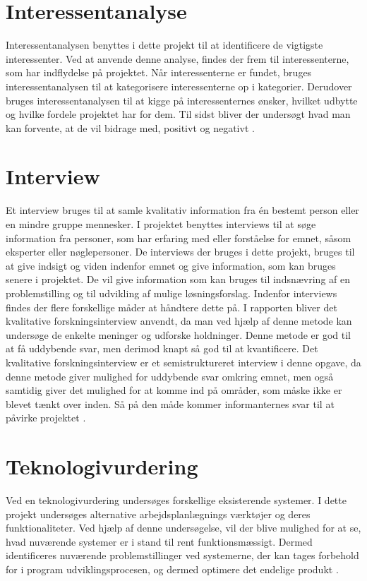 \section{Interessentanalyse}
Interessentanalysen benyttes i dette projekt til at identificere de vigtigste interessenter. Ved at anvende denne analyse, findes der frem til interessenterne, som har indflydelse på projektet. Når interessenterne er fundet, bruges interessentanalysen til at kategorisere interessenterne op i kategorier. Derudover bruges interessentanalysen til at kigge på interessenternes ønsker, hvilket udbytte og hvilke fordele projektet har for dem. Til sidst bliver der undersøgt hvad man kan forvente, at de vil bidrage med, positivt og negativt \citep{MetteLindegaardAttrup2008}.

\section{Interview}
Et interview bruges til at samle kvalitativ information fra én bestemt person eller en mindre gruppe mennesker. I projektet benyttes interviews til at søge information fra personer, som har erfaring med eller forståelse for emnet, såsom eksperter eller nøglepersoner. De interviews der bruges i dette projekt, bruges til at give indsigt og viden indenfor emnet og give information, som kan bruges senere i projektet. De vil give information som kan bruges til indsnævring af en problemstilling og til udvikling af mulige løsningsforslag.
Indenfor interviews findes der flere forskellige måder at håndtere dette på. I rapporten bliver det kvalitative forskningsinterview anvendt, da man ved hjælp af denne metode kan undersøge de enkelte meninger og udforske holdninger. Denne metode er god til at få uddybende svar, men derimod knapt så god til at kvantificere.
Det kvalitative forskningsinterview er et semistruktureret interview i denne opgave, da denne metode giver mulighed for uddybende svar omkring emnet, men også samtidig giver det mulighed for at komme ind på områder, som måske ikke er blevet tænkt over inden. Så på den måde kommer informanternes svar til at påvirke projektet \citep{BjarneHjorthAndersen, kvale2009}.

\section{Teknologivurdering}
Ved en teknologivurdering undersøges forskellige eksisterende systemer. I dette projekt undersøges alternative arbejdsplanlægnings værktøjer og deres funktionaliteter. Ved hjælp af denne undersøgelse, vil der blive mulighed for at se, hvad nuværende systemer er i stand til rent funktionsmæssigt. Dermed identificeres nuværende problemstillinger ved systemerne, der kan tages forbehold for i program udviklingsprocesen, og dermed optimere det endelige produkt \citep{PeterLarsen}.



